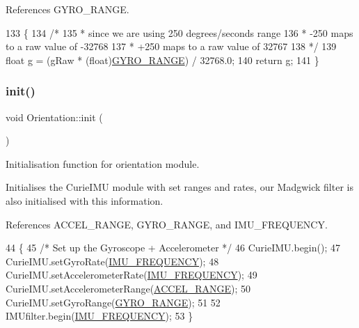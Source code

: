 References G\+Y\+R\+O\+\_\+\+R\+A\+N\+GE.


\begin{DoxyCode}
133 \{
134   \textcolor{comment}{/*}
135 \textcolor{comment}{   * since we are using 250 degrees/seconds range}
136 \textcolor{comment}{   * -250 maps to a raw value of -32768}
137 \textcolor{comment}{   * +250 maps to a raw value of 32767}
138 \textcolor{comment}{   */}
139   \textcolor{keywordtype}{float} g = (gRaw * (float)\hyperlink{_orientation_8cpp_af9a0775d43604d7410e3da3dbc90925a}{GYRO\_RANGE}) / 32768.0;
140   \textcolor{keywordflow}{return} g;
141 \}
\end{DoxyCode}
\mbox{\label{class_orientation_a317461c5c8afa8c3abf56847d4544728}} 
\subsubsection{\texorpdfstring{init()}{init()}}
{\footnotesize\ttfamily void Orientation\+::init (\begin{DoxyParamCaption}{ }\end{DoxyParamCaption})}



Initialisation function for orientation module. 

Initialises the Curie\+I\+MU module with set ranges and rates, our Madgwick filter is also initialised with this information. 

References A\+C\+C\+E\+L\+\_\+\+R\+A\+N\+GE, G\+Y\+R\+O\+\_\+\+R\+A\+N\+GE, and I\+M\+U\+\_\+\+F\+R\+E\+Q\+U\+E\+N\+CY.


\begin{DoxyCode}
44 \{
45   \textcolor{comment}{/* Set up the Gyroscope + Accelerometer */}
46   CurieIMU.begin();
47   CurieIMU.setGyroRate(\hyperlink{_orientation_8cpp_aacb21c2e16f8c38c985b8f02787a7baf}{IMU\_FREQUENCY});
48   CurieIMU.setAccelerometerRate(\hyperlink{_orientation_8cpp_aacb21c2e16f8c38c985b8f02787a7baf}{IMU\_FREQUENCY});
49   CurieIMU.setAccelerometerRange(\hyperlink{_orientation_8cpp_a16ec7011dea5773b504e875852f35fc1}{ACCEL\_RANGE});
50   CurieIMU.setGyroRange(\hyperlink{_orientation_8cpp_af9a0775d43604d7410e3da3dbc90925a}{GYRO\_RANGE});
51 
52   IMUfilter.begin(\hyperlink{_orientation_8cpp_aacb21c2e16f8c38c985b8f02787a7baf}{IMU\_FREQUENCY});
53 \}
\end{DoxyCode}
\mbox{\label{class_orientation_aad568a473f999c181abac46a4d832387}} 
